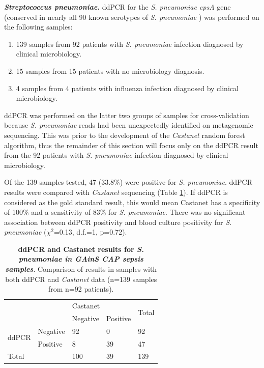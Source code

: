 \textbf{\textit{Streptococcus pneumoniae}.} ddPCR for the \textit{S. pneumoniae cpsA} gene (conserved in nearly all 90 known serotypes of \textit{S. pneumoniae} \parencite{Morona2004}) was performed on the following samples:
\begin{enumerate}
	\item 139 samples from 92 patients with \textit{S. pneumoniae} infection diagnosed by clinical microbiology.
	\item 15 samples from 15 patients with no microbiology diagnosis.
	\item 4 samples from 4 patients with influenza infection diagnosed by clinical microbiology.
\end{enumerate}

ddPCR was performed on the latter two groups of samples for cross-validation because \textit{S. pneumoniae} reads had been unexpectedly identified on metagenomic sequencing. This was prior to the development of the \textit{Castanet} random forest algorithm, thus the remainder of this section will focus only on the ddPCR result from the 92 patients with \textit{S. pneumoniae} infection diagnosed by clinical microbiology.

Of the 139 samples tested, 47 (33.8\%) were positive for \textit{S. pneumoniae}. ddPCR results were compared with \textit{Castanet} sequencing (Table \ref{tab:ddpcr-castanet}). If ddPCR is considered as the gold standard result, this would mean Castanet has a specificity of 100\% and a sensitivity of 83\% for \textit{S. pneumoniae}. There was no significant association between ddPCR positivity and blood culture positivity for \textit{S. pneumoniae} ($\chi^2$=0.13, d.f.=1, p=0.72).

\begin{table}[]
\begin{center}
\begin{tabular}{|l|l|l|l|l|}
\hline
\multicolumn{2}{|l|}{\multirow{2}{*}{}} & \multicolumn{2}{l|}{Castanet} & \multirow{2}{*}{Total} \\ \cline{3-4}
\multicolumn{2}{|l|}{}                  & Negative      & Positive      &                        \\ \hline
\multirow{2}{*}{ddPCR}    & Negative    & 92            & 0             & 92                     \\ \cline{2-5} 
                          & Positive    & 8             & 39            & 47                     \\ \hline
\multicolumn{2}{|l|}{Total}             & 100           & 39            & 139                    \\ \hline
\end{tabular}
\end{center}
\smallskip
\caption[ddPCR and Castanet results for \textit{S. pneumoniae}] {\textbf{ddPCR and Castanet results for \textit{S. pneumoniae in GAinS CAP sepsis samples}}. Comparison of results in samples with both ddPCR and \textit{Castanet} data (n=139 samples from n=92 patients).} 
\label{tab:ddpcr-castanet}
\end{table}

